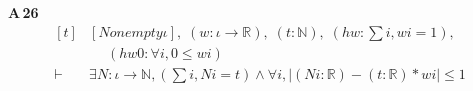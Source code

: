 \noindent\textbf{A\,26}\quad{}
{\footnotesize\[ \begin{aligned}[t]
&[\mathit{Nonempty} \iota ],\; (\mathit{w} : \iota \to \mathbb{R} ),\; (\mathit{t} : \mathbb{N} ),\; (\mathit{hw} : \textstyle\sum \mathit{i}, \mathit{w} \mathit{i} = 1),\\
&\quad \; (\mathit{hw0} : \forall \mathit{i}, 0 \leq \mathit{w} \mathit{i})\\
\vdash\;&\exists \mathit{N} : \iota \to \mathbb{N} , (\textstyle\sum \mathit{i}, \mathit{N} \mathit{i} = \mathit{t}) \wedge \forall \mathit{i}, |(\mathit{N} \mathit{i} : \mathbb{R} ) - (\mathit{t} : \mathbb{R} ) * \mathit{w} \mathit{i}| \leq 1
\end{aligned} \]}
